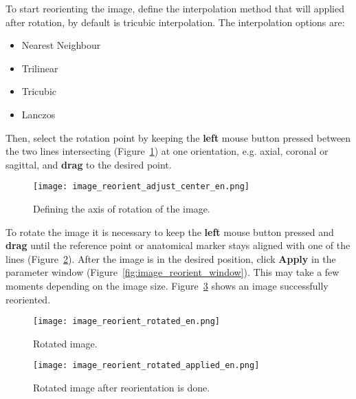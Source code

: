 To start reorienting the image, define the interpolation method that will applied after rotation, by default is tricubic interpolation. The interpolation options are:

\begin{itemize}
	\item Nearest Neighbour
	\item Trilinear
	\item Tricubic
	\item Lanczos
\end{itemize}


Then, select the rotation point by keeping the \textbf{left} mouse button pressed between the two lines intersecting (Figure~\ref{fig:image_reorient_adjust_center}) at one orientation, e.g. axial, coronal or sagittal, and \textbf{drag} to the desired point.

\begin{figure}[!htb]
\centering
\texttt{[image: image\_reorient\_adjust\_center\_en.png]}
\caption{Defining the axis of rotation of the image.}
\label{fig:image_reorient_adjust_center}
\end{figure}

To rotate the image it is necessary to keep the \textbf{left} mouse button pressed and \textbf{drag} until the reference point or anatomical marker stays aligned with one of the lines (Figure~\ref{fig:image_reorient_rotated}). After the image is in the desired position, click \textbf{Apply} in the parameter window (Figure~\ref{fig:image_reorient_window}). This may take a few moments depending on the image size. Figure~\ref{fig:image_reorient_rotated_applied} shows an image successfully reoriented.

\begin{figure}[!htb]
\centering
\texttt{[image: image\_reorient\_rotated\_en.png]}
\caption{Rotated image.}
\label{fig:image_reorient_rotated}
\end{figure}

\begin{figure}[!htb]
\centering
\texttt{[image: image\_reorient\_rotated\_applied\_en.png]}
\caption{Rotated image after reorientation is done.}
\label{fig:image_reorient_rotated_applied}
\end{figure}
